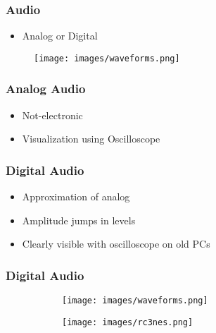 \begin{frame}
\frametitle{Audio}

\begin{itemize}
\item Analog or Digital
\end{itemize}

\begin{figure}
\texttt{[image: images/waveforms.png]}
\end{figure}

\end{frame}


\begin{frame}
\frametitle{Analog Audio}

\begin{itemize}
\item Not-electronic
\item Visualization using Oscilloscope
\end{itemize}

\end{frame}


\begin{frame}
\frametitle{Digital Audio}

\begin{itemize}
\item Approximation of analog
\item Amplitude jumps in levels
\item Clearly visible with oscilloscope on old PCs
\end{itemize}

\end{frame}


\begin{frame}
\frametitle[fragile]{Digital Audio}

\begin{figure}
	\begin{subfigure}[b]{0.4\textwidth}
		\texttt{[image: images/waveforms.png]}
	\end{subfigure}
	\begin{subfigure}[b]{0.5\textwidth}
		\texttt{[image: images/rc3nes.png]}
	\end{subfigure}
\end{figure}

\end{frame}

